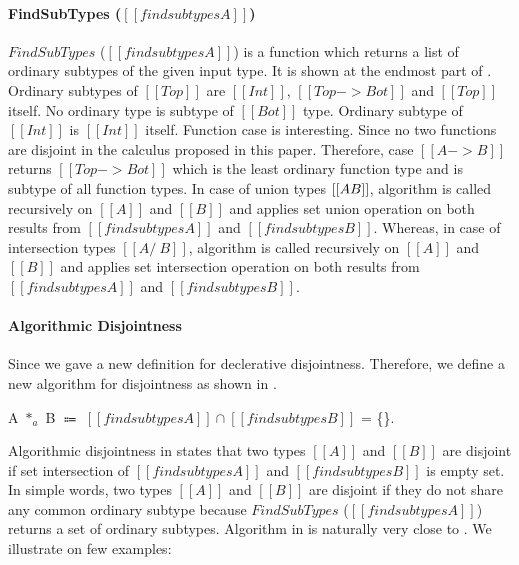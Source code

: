 \paragraph{FindSubTypes ($[[findsubtypes A]]$)}
$FindSubTypes$ ($[[findsubtypes A]]$) is a function which returns a list of ordinary subtypes
of the given input type. It is shown at the endmost part of .
Ordinary subtypes of $[[Top]]$ are $[[Int]]$, $[[Top -> Bot]]$ and $[[Top]]$ itself.
No ordinary type is subtype of $[[Bot]]$ type. Ordinary subtype of $[[Int]]$ is $[[Int]]$ itself.
Function case is interesting. Since no two functions are disjoint in the calculus proposed in this paper.
Therefore, case $[[A -> B]]$ returns $[[Top -> Bot]]$ which is the least ordinary function type
and is subtype of all function types. In case of union types $[[A \/ B]]$, algorithm is called recursively on
$[[A]]$ and $[[B]]$ and applies set union operation on both results from  $[[findsubtypes A]]$ and
$[[findsubtypes B]]$. Whereas, in case of intersection types $[[A /\ B]]$, algorithm is called recursively on
$[[A]]$ and $[[B]]$ and applies set intersection operation on both results from  $[[findsubtypes A]]$ and
$[[findsubtypes B]]$.

\paragraph{Algorithmic Disjointness}
Since we gave a new definition for declerative disjointness.
Therefore, we define a new algorithm for disjointness as shown in .

\begin{definition}
\label{def:inter:ad}
  A $*_a$ B $\Coloneqq$  $ [[findsubtypes A]] \cap [[findsubtypes B]] $ = \{\}.
\end{definition}

\noindent Algorithmic disjointness in  states that two types $[[A]]$ and $[[B]]$
are disjoint
if set intersection of $[[findsubtypes A]]$ and $[[findsubtypes B]]$ is empty set. In simple words,
two types $[[A]]$ and $[[B]]$ are disjoint if they do not share any common ordinary subtype because
$FindSubTypes$ ($[[findsubtypes A]]$) returns a set of ordinary subtypes. Algorithm in 
is naturally very close to . We illustrate  on few examples:

